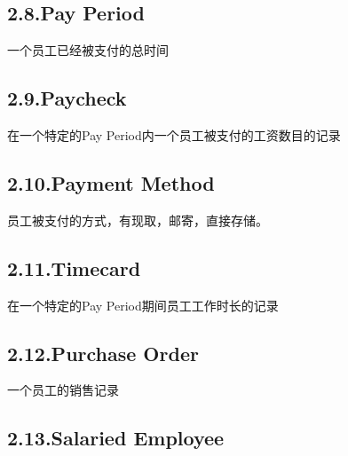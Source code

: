 \documentclass{article}
\begin{document}
\subsection{2.8.\hspace*{0.5em}Pay Period}\label{sec-pay-period}%

\noindent{}一个员工已经被支付的总时间%

\subsection{2.9.\hspace*{0.5em}Paycheck}\label{sec-paycheck}%

\noindent{}在一个特定的Pay Period内一个员工被支付的工资数目的记录%

\subsection{2.10.\hspace*{0.5em}Payment Method}\label{sec-payment-method}%

\noindent{}员工被支付的方式，有现取，邮寄，直接存储。%

\subsection{2.11.\hspace*{0.5em}Timecard}\label{sec-timecard}%

\noindent{}在一个特定的Pay Period期间员工工作时长的记录%

\subsection{2.12.\hspace*{0.5em}Purchase Order}\label{sec-purchase-order}%

\noindent{}一个员工的销售记录%

\subsection{2.13.\hspace*{0.5em}Salaried Employee}\label{sec-salaried-employee}%
\end{document}
